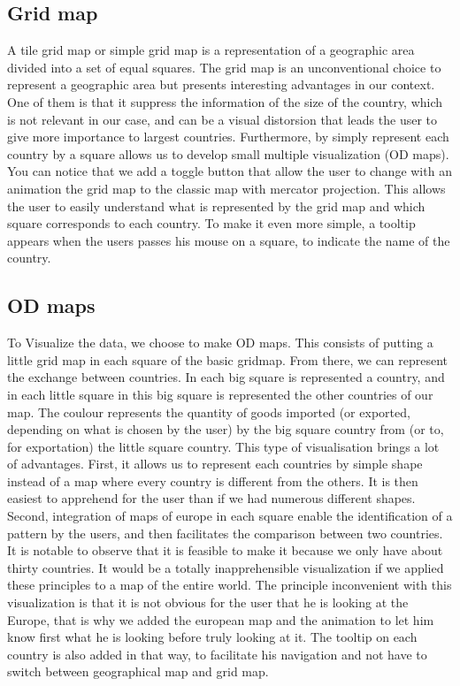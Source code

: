 \documentclass{vgtc}
\begin{document}
\subsection{Grid map}
A tile grid map or simple grid map is a representation of a geographic area divided into a set of equal squares\cite{Good Data Visualization Practice: Tile Grid Maps}.
The grid map is an unconventional choice to represent a geographic area but presents interesting advantages in our context. One of them is that it suppress the information of the size of the country, which is not relevant in our case, and can be a visual distorsion that leads the user to give more importance to largest countries. Furthermore, by simply represent each country by a square allows us to develop small multiple visualization (OD maps). You can notice that we add a toggle button that allow the user to change with an animation the grid map to the classic map with mercator projection. This allows the user to easily understand what is represented by the grid map and which square corresponds to each country. To make it even more simple, a tooltip appears when the users passes his mouse on a square, to indicate the name of the country. 



\subsection{OD maps}
To Visualize the data, we choose to make OD maps. This consists of putting a little grid map in each square of the basic gridmap. From there, we can represent the exchange between countries. In each big square is represented a country, and in each little square in this big square is represented the other countries of our map. The coulour represents the quantity of goods imported (or exported, depending on what is chosen by the user) by the big square country from (or to, for exportation) the little square country. 
This type of visualisation brings a lot of advantages. First, it allows us to represent each countries by simple shape instead of a map where every country is different from the others. It is then easiest to apprehend for the user than if we had numerous different shapes. Second, integration of maps of europe in each square enable the identification of a pattern by the users, and then facilitates the comparison between two countries. It is notable to observe that it is feasible to make it because we only have about thirty countries. It would be a totally inapprehensible visualization if we applied these principles to a map of the entire world. The principle inconvenient with this visualization is that it is not obvious for the user that he is looking at the Europe, that is why we added the european map and the animation to let him know first what he is looking before truly looking at it. The tooltip on each country is also added in that way, to facilitate his navigation and not have to switch between geographical map and grid map. 
\end{document}
